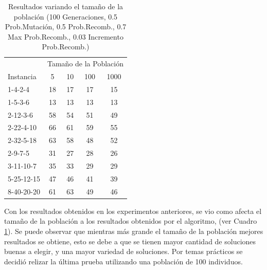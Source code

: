 \documentclass[letter, 10pt]{article}
\begin{document}
\begin{table}[]
\centering
\begin{tabular}{l|cccc}
    \hline
                &\multicolumn{4}{c}{Tamaño de la Población}\\
   Instancia    &   5   &   10  &   100  &   1000\\
    \hline
    1-4-2-4     &   18  &   17  &   17  &   15  \\
    1-5-3-6     &   13  &   13  &   13  &   13  \\ 
    2-12-3-6    &   58  &   54  &   51  &   49  \\
    2-22-4-10   &   66  &   61  &   59  &   55  \\
    2-32-5-18   &   63  &   58  &   48  &   52  \\
    2-9-7-5     &   31  &   27  &   28  &   26  \\
    3-11-10-7   &   35  &   33  &   29  &   29  \\
    5-25-12-15  &   47  &   46  &   41  &   39  \\
    8-40-20-20  &   61  &   63  &   49  &   46  
\end{tabular}
\caption{Resultados variando el tamaño de la población (100 Generaciones, 0.5 Prob.Mutación, 0.5 Prob.Recomb., 0.7 Max Prob.Recomb., 0.03 Incremento Prob.Recomb.)}
\label{tab:mutate}
\end{table}

Con los resultados obtenidos en los experimentos anteriores, se vio como afecta el tamaño de la población a los resultados obtenidos por el algoritmo, (ver Cuadro \ref{tab:mutate}). Se puede observar que mientras más grande el tamaño de la población mejores resultados se obtiene, esto se debe a que se tienen mayor cantidad de soluciones buenas a elegir, y una mayor variedad de soluciones. Por temas prácticos se decidió relizar la última prueba utilizando una población de 100 individuos.
\end{document}
